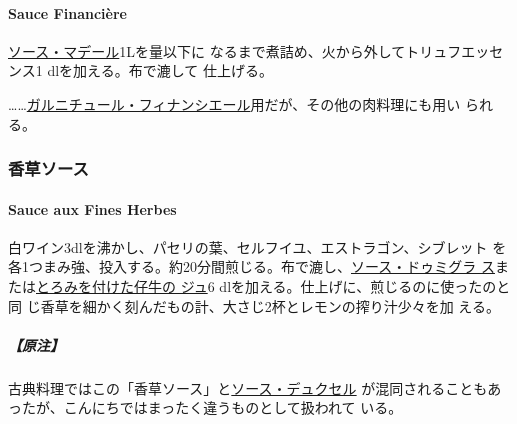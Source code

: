 \begin{recette}
\hypertarget{sauce-financiere}{%
\paragraph{Sauce Financière}\label{sauce-financiere}}

  

\protect\hyperlink{sauce-madere}{ソース・マデール}1\unquart{}Lを\troisquarts{}量以下に
なるまで煮詰め、火から外してトリュフエッセンス1 dlを加える。布で漉して
仕上げる。

\ldots{}\ldots{}\href{}{ガルニチュール・フィナンシエール}用だが、その他の肉料理にも用い
られる。

\maeaki

\hypertarget{ux9999ux8349ux30bdux30fcux30b9}{%
\subsubsection{香草ソース}\label{ux9999ux8349ux30bdux30fcux30b9}}

\hypertarget{sauce-aux-fines-herbes}{%
\paragraph{Sauce aux Fines Herbes}\label{sauce-aux-fines-herbes}}

  
 

白ワイン3dlを沸かし、パセリの葉、セルフイユ、エストラゴン、シブレット
を各1つまみ強、投入する。約20分間煎じる。布で漉し、\protect\hyperlink{sauce-demi-glace}{ソース・ドゥミグラ
ス}または\protect\hyperlink{jus-de-veau-lie}{とろみを付けた仔牛の ジュ}6
dlを加える。仕上げに、煎じるのに使ったのと同
じ香草を細かく刻んだもの計、大さじ2\undemi{}杯とレモンの搾り汁少々を加
える。

\hypertarget{ux539fux6ce8-2}{%
\subparagraph{【原注】}\label{ux539fux6ce8-2}}

古典料理ではこの「香草ソース」と\protect\hyperlink{sauce-duxelles}{ソース・デュクセル}
が混同されることもあったが、こんにちではまったく違うものとして扱われて
いる。


\end{recette}
